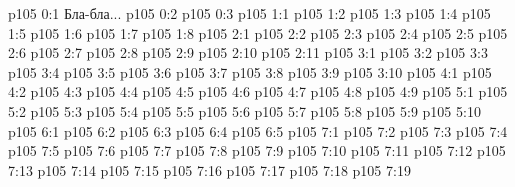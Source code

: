 \author{Мелхиседек}
\vs p105 0:1  Бла-бла...
\vs p105 0:2 
\vs p105 0:3 
\vs p105 1:1 
\vs p105 1:2 
\vs p105 1:3 \pc 
\vs p105 1:4 
\vs p105 1:5 
\vs p105 1:6 \pc 
\vs p105 1:7 
\vs p105 1:8 
\vs p105 2:1 
\vs p105 2:2 \pc 
\vs p105 2:3 
\vs p105 2:4 
\vs p105 2:5 
\vs p105 2:6 
\vs p105 2:7 
\vs p105 2:8 
\vs p105 2:9 
\vs p105 2:10 
\vs p105 2:11 
\vs p105 3:1 
\vs p105 3:2 
\vs p105 3:3 
\vs p105 3:4 
\vs p105 3:5 
\vs p105 3:6 
\vs p105 3:7 
\vs p105 3:8 
\vs p105 3:9 \pc 
\vs p105 3:10 
\vs p105 4:1 
\vs p105 4:2 
\vs p105 4:3 
\vs p105 4:4 
\vs p105 4:5 
\vs p105 4:6 
\vs p105 4:7 \pc 
\vs p105 4:8 
\vs p105 4:9 
\vs p105 5:1 
\vs p105 5:2 
\vs p105 5:3 \pc 
\vs p105 5:4 \pc 
\vs p105 5:5 
\vs p105 5:6 
\vs p105 5:7 
\vs p105 5:8 
\vs p105 5:9 \pc 
\vs p105 5:10 
\vs p105 6:1 
\vs p105 6:2 
\vs p105 6:3 
\vs p105 6:4 
\vs p105 6:5 
\vs p105 7:1 
\vs p105 7:2 
\vs p105 7:3 
\vs p105 7:4 \pc 
\vs p105 7:5 
\vs p105 7:6 
\vs p105 7:7 
\vs p105 7:8 
\vs p105 7:9 
\vs p105 7:10 
\vs p105 7:11 
\vs p105 7:12 
\vs p105 7:13 
\vs p105 7:14 
\vs p105 7:15 \pc 
\vs p105 7:16 
\vs p105 7:17 
\vs p105 7:18 \pc 
\vsetoff
\vs p105 7:19 
\quizlink
